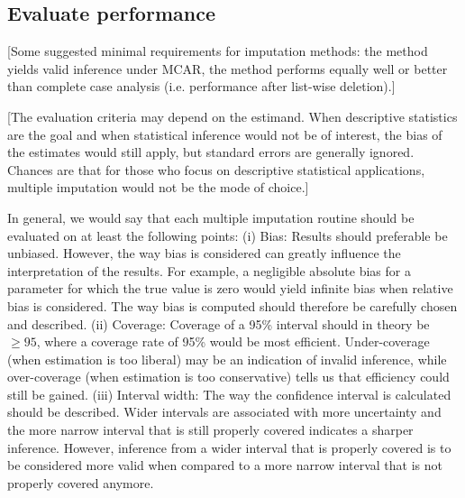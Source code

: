 \documentclass[bimj,fleqn]{w-art}
\begin{document}
\subsection{Evaluate performance}


[Some suggested minimal requirements for imputation methods: the method yields valid inference under MCAR, the method performs equally well or better than complete case analysis (i.e. performance after list-wise deletion).]

[The evaluation criteria may depend on the estimand. When descriptive statistics are the goal and when statistical inference would not be of interest, the bias of the estimates would still apply, but standard errors are generally ignored. Chances are that for those who focus on descriptive statistical applications, multiple imputation would not be the mode of choice.] 

In general, we would say that each multiple imputation routine should be evaluated on at least the following points:
 (i) Bias: Results should preferable be unbiased. However, the way bias is considered can greatly influence the interpretation of the results. For example, a negligible absolute bias for a parameter for which the true value is zero would yield infinite bias when relative bias is considered. The way bias is computed should therefore be carefully chosen and described. 
(ii) Coverage: Coverage of a 95\% interval should in theory be $\geq 95$, where a coverage rate of 95\% would be most efficient. Under-coverage (when estimation is too liberal) may be an indication of invalid inference, while over-coverage (when estimation is too conservative) tells us that efficiency could still be gained. 
(iii) Interval width: The way the confidence interval is calculated should be described. Wider intervals are associated with more uncertainty and the more narrow interval that is still properly covered indicates a sharper inference. However, inference from a wider interval that is properly covered is to be considered more valid when compared to a more narrow interval that is not properly covered anymore. 
\end{document}
